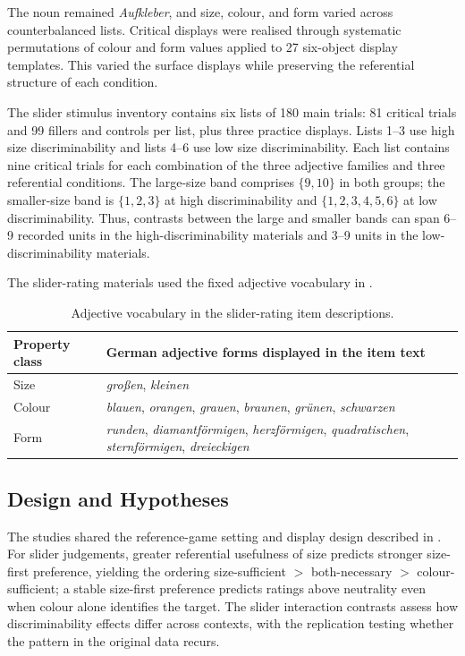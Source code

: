 \documentclass[10pt,a4paper,fleqn]{article}
\begin{document}
The noun remained \emph{Aufkleber}, and size, colour, and form varied across counterbalanced lists.
Critical displays were realised through systematic permutations of colour and form values applied to 27 six-object display templates.
This varied the surface displays while preserving the referential structure of each condition.

The slider stimulus inventory contains six lists of 180 main trials: 81 critical trials and 99 fillers and controls per list, plus three practice displays.
Lists 1--3 use high size discriminability and lists 4--6 use low size discriminability.
Each list contains nine critical trials for each combination of the three adjective families and three referential conditions.
The large-size band comprises $\{9,10\}$ in both groups; the smaller-size band is $\{1,2,3\}$ at high discriminability and $\{1,2,3,4,5,6\}$ at low discriminability.
Thus, contrasts between the large and smaller bands can span 6--9 recorded units in the high-discriminability materials and 3--9 units in the low-discriminability materials.

The slider-rating materials used the fixed adjective vocabulary in .

\begin{table}[H]
\centering
\caption{Adjective vocabulary in the slider-rating item descriptions.}
\label{tab:slider-vocabulary}
\footnotesize
\begin{tabularx}{\textwidth}{p{2.2cm}X}
\hline
Property class & German adjective forms displayed in the item text \\
\hline
Size & \emph{gro{\ss}en}, \emph{kleinen} \\
Colour & \emph{blauen}, \emph{orangen}, \emph{grauen}, \emph{braunen}, \emph{gr\"unen}, \emph{schwarzen} \\
Form & \emph{runden}, \emph{diamantf\"ormigen}, \emph{herzf\"ormigen}, \emph{quadratischen}, \emph{sternf\"ormigen}, \emph{dreieckigen} \\
\hline
\end{tabularx}
\end{table}

\subsection{Design and Hypotheses}

The studies shared the reference-game setting and display design described in .
For slider judgements, greater referential usefulness of size predicts stronger size-first preference, yielding the ordering size-sufficient $>$ both-necessary $>$ colour-sufficient; a stable size-first preference predicts ratings above neutrality even when colour alone identifies the target.
The slider interaction contrasts assess how discriminability effects differ across contexts, with the replication testing whether the pattern in the original data recurs.
\end{document}

